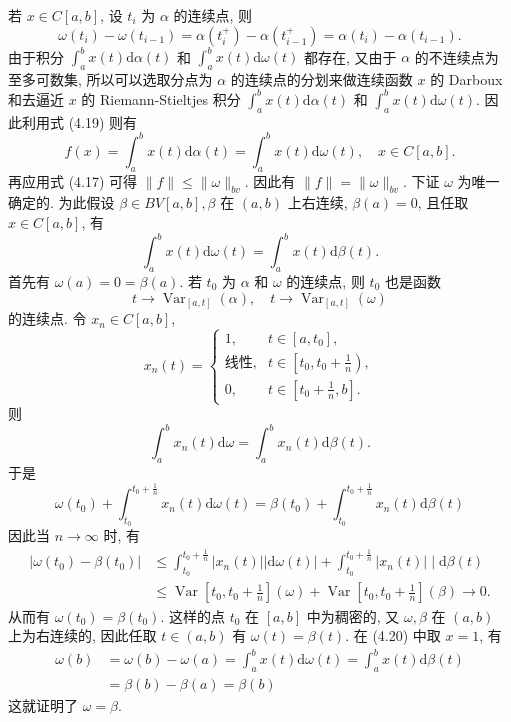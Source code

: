 \documentclass[openany]{ctexbook}
\makeatletter
\theoremstyle{kaiti}
\theoremstyle{normal}
\renewenvironment{proof}[1][\proofname]{\par
    \pushQED{\qed}%
    \normalfont \topsep6\p@\@plus6\p@\relax
    \trivlist
    \item\relax
    {\heiti #1}\hspace{2\labelsep}\ignorespaces
  }{%
    \popQED\endtrivlist\@endpefalse
  }
\makeatother
\begin{document}
\begin{proof}
若 $x \in C[a, b]$, 设 $t_{i}$ 为 $\alpha$ 的连续点, 则
$$
\omega\left(t_{i}\right)-\omega\left(t_{i-1}\right)=\alpha\left(t_{i}^{+}\right)-\alpha\left(t_{i-1}^{+}\right)=\alpha\left(t_{i}\right)-\alpha\left(t_{i-1}\right).
$$
由于积分 $\int_{a}^{b} x(t) \mathrm{d} \alpha(t)$ 和 $\int_{a}^{b} x(t) \mathrm{d} \omega(t)$ 都存在, 又由于 $\alpha$ 的不连续点为至多可数集, 所以可以选取分点为 $\alpha$ 的连续点的分划来做连续函数 $x$ 的 Darboux 和去逼近 $x$ 的 Riemann-Stieltjes 积分 $\int_{a}^{b} x(t) \mathrm{d} \alpha(t)$ 和 $\int_{a}^{b} x(t) \mathrm{d} \omega(t)$. 因此利用式 (4.19) 则有
$$
f(x)=\int_{a}^{b} x(t) \mathrm{d} \alpha(t)=\int_{a}^{b} x(t) \mathrm{d} \omega(t), \quad x \in C[a, b].
$$
再应用式 (4.17) 可得 $\|f\| \leqslant\|\omega\|_{b v}$. 因此有 $\|f\|=\|\omega\|_{b v}$.
下证 $\omega$ 为唯一确定的. 为此假设 $\beta \in B V[a, b], \beta$ 在 $(a, b)$ 上右连续, $\beta(a)=0$, 且任取
$x \in C[a, b]$, 有
\begin{equation}
  \int_{a}^{b} x(t) \mathrm{d} \omega(t)=\int_{a}^{b} x(t) \mathrm{d} \beta(t).
\end{equation}
首先有 $\omega(a)=0=\beta(a)$. 若 $t_0$ 为 $\alpha$ 和 $\omega$ 的连续点, 则 $t_0$ 也是函数
$$
t \rightarrow \operatorname{Var}_{[a, t]}(\alpha), \quad t \rightarrow \operatorname{Var}_{[a, t]}(\omega)
$$
的连续点. 令 $x_n \in C[a, b]$,
$$
x_n(t)= \begin{cases}1, & t \in\left[a, t_0\right], \\ \text{线性}, & t \in\left[t_0, t_0+\frac{1}{n}\right), \\ 0, & t \in\left[t_0+\frac{1}{n}, b\right].\end{cases}
$$
则
$$
\int_{a}^{b} x_n(t) \mathrm{d} \omega=\int_{a}^{b} x_n(t) \mathrm{d} \beta(t).
$$
于是
$$
\omega\left(t_0\right)+\int_{t_0}^{t_0+\frac{1}{n}} x_n(t) \mathrm{d} \omega(t)=\beta\left(t_0\right)+\int_{t_0}^{t_0+\frac{1}{n}} x_n(t) \mathrm{d} \beta(t)
$$
因此当 $n \rightarrow \infty$ 时, 有
$$
\begin{aligned}
\left|\omega\left(t_0\right)-\beta\left(t_0\right)\right| & \leqslant \int_{t_0}^{t_0+\frac{1}{n}}\left|x_n(t)\right||\mathrm{d} \omega(t)|+\int_{t_0}^{t_0+\frac{1}{n}}\left|x_n(t)\right| \mid \mathrm{d} \beta(t) \\
& \leqslant \operatorname{Var}\left[t_0, t_0+\frac{1}{n}\right](\omega)+\operatorname{Var}\left[t_0, t_0+\frac{1}{n}\right](\beta) \rightarrow 0.
\end{aligned}
$$
从而有 $\omega\left(t_0\right)=\beta\left(t_0\right)$. 这样的点 $t_0$ 在 $[a, b]$ 中为稠密的, 又 $\omega, \beta$ 在 $(a, b)$ 上为右连续的, 因此任取 $t \in(a, b)$ 有 $\omega(t)=\beta(t)$. 在 (4.20) 中取 $x=1$, 有
$$
\begin{aligned}
\omega(b) &=\omega(b)-\omega(a)=\int_{a}^{b} x(t) \mathrm{d} \omega(t)=\int_{a}^{b} x(t) \mathrm{d} \beta(t) \\
&=\beta(b)-\beta(a)=\beta(b)
\end{aligned}
$$
这就证明了 $\omega=\beta$.
\end{proof}
\end{document}
